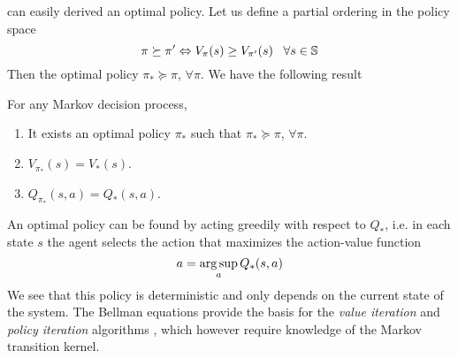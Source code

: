 can easily derived an optimal policy. Let us define a partial ordering in the 
policy space
\begin{equation}
	\pi \succeq \pi' \Leftrightarrow V_\pi(s) \geq V_{\pi'}(s) \;\;\; \forall s \in \S
\end{equation}
Then the optimal policy $\pi_* \succeq \pi$, $\forall \pi$. We have the
following result
\begin{theorem}
	For any Markov decision process,
	\begin{enumerate}[label={\roman*)}]
		\item It exists an optimal policy $\pi_*$ such that $\pi_* \succeq
			\pi$, $\forall \pi$. 
		\item $V_{\pi_*}(s) = V_*(s)$.
		\item $Q_{\pi_*}(s,a) = Q_*(s,a)$. 
	\end{enumerate}
\end{theorem}
An optimal policy can be found by acting greedily with respect to $Q_*$, i.e. in each state $s$ the agent selects the action that maximizes the action-value function
\begin{equation}
	a = \argsup_a Q_*(s,a)
\end{equation}
We see that this policy is deterministic and only depends on the current state
of the system. The Bellman equations provide the basis for the \emph{value iteration} and \emph{policy iteration} algorithms \cite{sutton1998introduction}, which however require knowledge of the Markov transition kernel.


